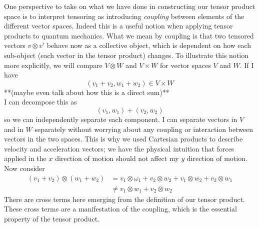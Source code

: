    One perspective to take on what we have done in constructing our tensor product space is to interpret tensoring as introducing \textit{coupling} between elements of the different vector spaces.  Indeed this is a useful notion when applying tensor products to quantum mechanics.  What we mean by coupling is that two tensored vectors $v\otimes v'$ behave now as a collective object, which is dependent on how each sub-object (each vector in the tensor product) changes.  To illustrate this notion more explicitly, we will compare $V\otimes W$ and $V\times W$ for vector spaces $V$ and $W$.  If I have 
   \begin{equation*}
   	(v_1+v_2, w_1+w_2) \in V\times W
   \end{equation*} 
     **(maybe even talk about how this is a direct sum)**\\
     I can decompose this as 
     \begin{equation*}
     	(v_1, w_1)+(v_2, w_2)
     \end{equation*}
     so we can independently separate each component.  I can separate vectors in $V$ and in $W$ separately without worrying about any coupling or interaction between vectors in the two spaces.  This is why we used Cartesian products to describe velocity and acceleration vectors; we have the physical intuition that forces applied in the $x$ direction of motion should not affect my $y$ direction of motion.  Now consider 
     \begin{align*}
     	(v_1+v_2)\otimes(w_1+w_2) &= v_1\otimes \omega_1+v_2\otimes w_2+v_1\otimes w_2 +v_2\otimes w_1 \\
     	&\neq v_1\otimes w_1+v_2\otimes w_2
     \end{align*}
     There are cross terms here emerging from the definition of our tensor product.  These cross terms are a manifestation of the coupling, which is the essential property of the tensor product.\\
     
